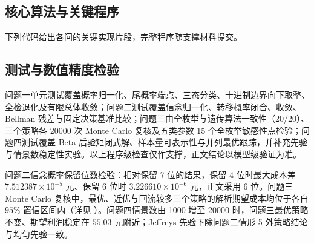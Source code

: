 \subsection{核心算法与关键程序}

下列代码给出各问的关键实现片段，完整程序随支撑材料提交。









\subsection{测试与数值精度检验}

问题一单元测试覆盖概率归一化、尾概率端点、三态分类、十进制边界向下取整、全检退化及有限总体收敛；问题二测试覆盖信念归一化、转移概率闭合、收敛、Bellman 残差与固定决策基准比较；问题三由全枚举与遗传算法一致性（20/20）、三个策略各 20000 次 Monte Carlo 复核及五类参数 15 个全枚举敏感性点检验；问题四测试覆盖 Beta 后验矩闭式解、样本量可表示性与并列最优跟踪，并补充先验与情景数稳定性实验。以上程序级检查仅作支撑，正文结论以模型级验证为准。

问题二信念概率保留位数检验：相对保留 7 位的结果，保留 4 位时最大成本差 $7.512387\times10^{-5}$ 元、保留 6 位时 $3.226610\times10^{-6}$ 元，正文采用 6 位。问题三 Monte Carlo 复核中，最优、近优与回流较多三个策略的解析期望成本均位于各自 $95\%$ 置信区间内（详见 ）。问题四情景数由 1000 增至 20000 时，问题三最优策略不变、期望利润稳定在 $55.03$ 元附近；Jeffreys 先验下除问题二情形 5 外策略结论与均匀先验一致。

